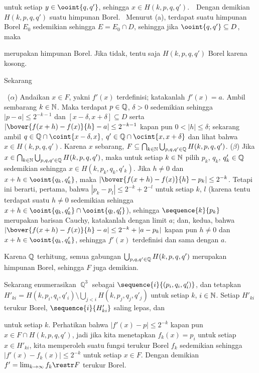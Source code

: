 {\noindent untuk setiap $y\in\ooint{q,q'}$, sehingga
$x\in H(k,p,q,q')$.\ \QeD\ Dengan demikian $H(k,p,q,q')$ suatu himpunan
Borel. \Prf\ Menurut (a), terdapat suatu himpunan Borel $E_0$ sedemikian
sehingga $E=E_0\cap D$, sehingga jika $\ooint{q,q'}\subseteq D$, maka


\noindent merupakan himpunan Borel. Jika tidak, tentu saja
$H(k,p,q,q')$ Borel karena kosong.\ \Qed

\medskip

 Sekarang


\noindent \Prf\ ($\alpha$) Andaikan $x\in F$, yakni $f'(x)$ terdefinisi;
katakanlah $f'(x)=a$. Ambil sembarang $k\in\Bbb N$. Maka terdapat
$p\in\Bbb Q$, $\delta>0$ sedemikian sehingga
$|p-a|\le 2^{-k-1}$ dan $[x-\delta,x+\delta]\subseteq D$ serta
$|\bover{f(x+h)-f(x)}{h}-a|\le 2^{-k-1}$ kapan pun
$0<|h|\le\delta$; sekarang ambil
$q\in\Bbb Q\cap\coint{x-\delta,x}$,
$q'\in\Bbb Q\cap\ocint{x,x+\delta}$ dan lihat bahwa
$x\in H(k,p,q,q')$. Karena $x$ sebarang,
$F\subseteq\bigcap_{k\in\Bbb N}\bigcup_{p,q,q'\in\Bbb Q}H(k,p,q,q')$.
($\beta$) Jika
$x\in\bigcap_{k\in\Bbb N}\bigcup_{p,q,q'\in\Bbb Q}H(k,p,q,q')$, maka untuk
setiap $k\in\Bbb N$ pilih $p_k$, $q_k$, $q'_k\in\Bbb Q$ sedemikian sehingga
$x\in H(k,p_k,q_k,q'_k)$. Jika $h\ne 0$ dan
$x+h\in\ooint{q_k,q'_k}$, maka
$|\bover{f(x+h)-f(x)}{h}-p_k|\le 2^{-k}$.
Tetapi ini berarti, pertama, bahwa $|p_k-p_l|\le 2^{-k}+2^{-l}$ untuk setiap
$k$, $l$ (karena tentu terdapat suatu $h\ne 0$ sedemikian sehingga
$x+h\in\ooint{q_k,q'_k}\cap\ooint{q_l,q'_l}$), sehingga
$\sequence{k}{p_k}$ merupakan barisan Cauchy, katakanlah dengan limit $a$;
dan, kedua, bahwa
$|\bover{f(x+h)-f(x)}{h}-a|\le 2^{-k}+|a-p_k|$ kapan pun
$h\ne 0$ dan $x+h\in\ooint{q_k,q'_k}$, sehingga $f'(x)$ terdefinisi dan
sama dengan $a$.\ \Qed

\medskip

 Karena $\Bbb Q$ terhitung, semua gabungan
$\bigcup_{p,q,q'\in\Bbb Q}H(k,p,q,q')$ merupakan himpunan Borel, sehingga
$F$ juga demikian.

\medskip

 Sekarang enumerasikan $\BbbQ^3$ sebagai
$\sequence{i}{(p_i,q_i,q'_i)}$, dan tetapkan
$H'_{ki}=H(k,p_i,q_i,q'_i)\setminus\bigcup_{j<i}H(k,p_j,q_j,q'_j)$ untuk
setiap $k$, $i\in\Bbb N$. Setiap $H'_{ki}$ terukur Borel,
$\sequence{i}{H'_{ki}}$ saling lepas, dan


\noindent untuk setiap $k$. Perhatikan bahwa
$|f'(x)-p|\le 2^{-k}$ kapan pun $x\in F\cap H(k,p,q,q')$, jadi jika kita
menetapkan $f_k(x)=p_i$ untuk setiap $x\in H'_{ki}$, kita memperoleh suatu
fungsi terukur Borel $f_k$ sedemikian sehingga
$|f'(x)-f_k(x)|\le 2^{-k}$ untuk setiap $x\in F$.
Dengan demikian $f'=\lim_{k\to\infty}f_k\restr F$ terukur Borel.
}%

